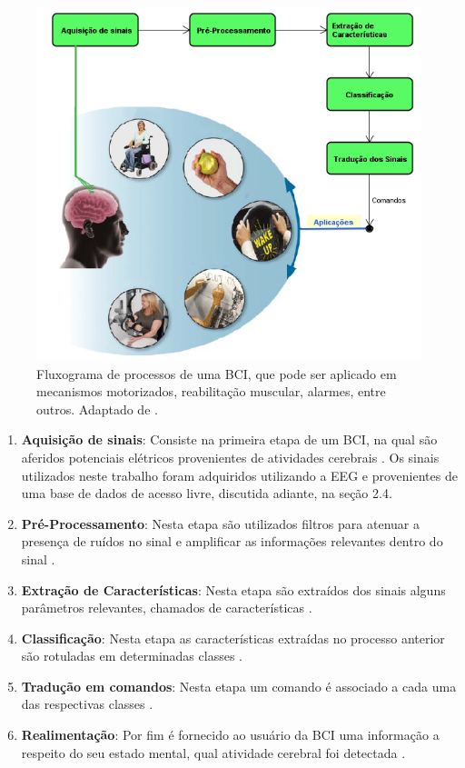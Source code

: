 \begin{figure}[h!]
	\centering
	\includegraphics[keepaspectratio=true,scale=0.6]{figuras/Fluxograma_BCI.PNG}
	\caption{Fluxograma de processos de uma BCI, que pode ser aplicado em mecanismos motorizados, reabilitação muscular, alarmes, entre outros. Adaptado de \cite{BCIWolpaw}.}
	\label{BCI_flow}
\end{figure}

\begin{enumerate}
	\item \textbf{Aquisição de sinais}: Consiste na primeira etapa de um BCI, na qual são aferidos potenciais elétricos provenientes de atividades cerebrais \cite{SIULYDissertacao}. Os sinais utilizados neste trabalho foram adquiridos utilizando a EEG e provenientes de uma base de dados de acesso livre, discutida adiante, na seção 2.4.
	\item \textbf{Pré-Processamento}: Nesta etapa são utilizados filtros para atenuar a presença de ruídos no sinal e amplificar as informações relevantes dentro do sinal \cite{SIULYDissertacao}.
	\item \textbf{Extração de Características}: Nesta etapa são extraídos dos sinais alguns parâmetros relevantes, chamados de características \cite{SIULYDissertacao}.
	\item \textbf{Classificação}: Nesta etapa as características extraídas no processo anterior são rotuladas em determinadas classes \cite{SIULYDissertacao}. 
	\item \textbf{Tradução em comandos}: Nesta etapa um comando é associado a cada uma das respectivas classes \cite{SIULYDissertacao}.
	\item \textbf{Realimentação}: Por fim é fornecido ao usuário da BCI uma informação a respeito do seu estado mental, qual atividade cerebral foi detectada \cite{SIULYDissertacao}.
\end{enumerate}

